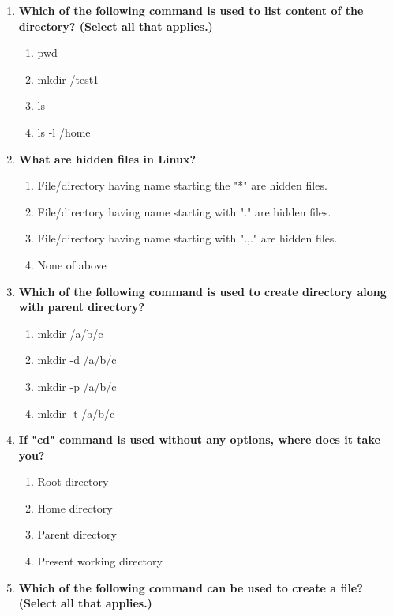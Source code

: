\begin{flushleft}
	\begin{enumerate}
		\item \textbf{Which of the following command is used to list content of the directory? (Select all that applies.)}
		\begin{enumerate}[label=(\alph*)]
			\item pwd
			\item mkdir /test1
			\item ls                  %
			\item ls -l /home         %
		\end{enumerate}
		\bigskip
		\bigskip
		\item \textbf{What are hidden files in Linux?}
		\begin{enumerate}[label=(\alph*)]
			\item File/directory having name starting the "*" are hidden files.         
			\item File/directory having name starting with "." are hidden files. %
			\item File/directory having name starting with ".,." are hidden files.
			\item None of above
		\end{enumerate}
		\bigskip
		\bigskip
		\item \textbf{Which of the following command is used to create directory along with parent directory?}
		\begin{enumerate}[label=(\alph*)]
			\item mkdir /a/b/c
			\item mkdir -d /a/b/c 
			\item mkdir -p /a/b/c  %
			\item mkdir -t /a/b/c
		\end{enumerate}
		\bigskip
		\bigskip
		\item \textbf{If "cd" command is used without any options, where does it take you?}
		\begin{enumerate}[label=(\alph*)]
			\item Root directory
			\item Home directory %
			\item Parent directory 
			\item Present working directory
		\end{enumerate}
		\bigskip
		\bigskip
		\item \textbf{Which of the following command can be used to create a file? (Select all that applies.)}
		\begin{enumerate}[label=(\alph*)]

\end{enumerate}
\end{enumerate}
\end{flushleft}

